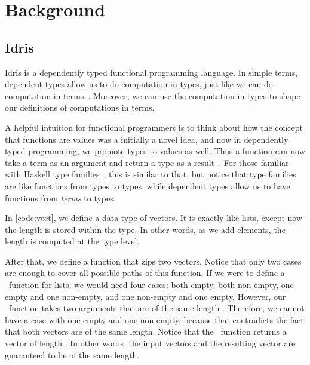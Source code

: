 \chapter{Background}\label{chap:background}

\newcommand{\zip}{\fn{zip}}
\section{Idris}

Idris is a dependently typed functional programming language. In simple terms,
dependent types allow us to do computation in types, just like we can do
computation in terms~\cite{davidphd}. Moreover, we can use the computation
in types to shape our definitions of computations in terms.

A helpful intuition for functional programmers is to think about how the
concept that functions are values was a initially a novel idea, and now in
dependently typed programming, we promote types to values as well.
Thus a function can now take a term as an argument and return a type as a
result~\cite{lambdacube,henk}.
For those familiar with Haskell type families~\cite{typefamilies}, this is
similar to that, but notice that type families are like functions from types to types,
while dependent types allow us to have functions from \emph{terms} to types.

In \autoref{code:vect}, we define a data type of vectors. It is exactly
like lists, except now the length is stored within the type. In other
words, as we add elements, the length is computed at the type level.

After that, we define a function that zips two vectors. Notice that only two
cases are enough to cover all possible paths of this function. If we were to
define a \zip\ function for lists, we would need four cases: both empty, both
non-empty, one empty and one non-empty, and one non-empty and one empty.
However, our \zip\ function takes two arguments that are of the same length
.  Therefore, we cannot have a case with one empty and one non-empty,
because that contradicts the fact that both vectors are of the same
length. Notice that the \zip\ function returns a vector of length .
In other words, the input vectors and the resulting vector are guaranteed to be
of the same length.

